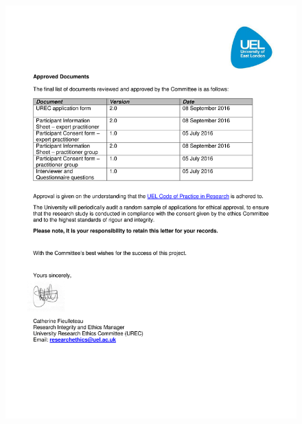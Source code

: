 \begin{center}
\begin{figure}[h]
\includegraphics[width=1.0\linewidth]{Figures/EoinWoods-UREC-approval-letter-090916-2}
\end{figure}
\end{center}

%
